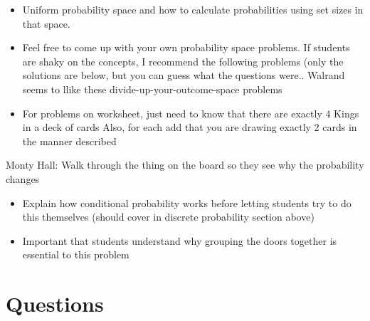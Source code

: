 \documentclass{exam}
\begin{document}
\begin{questions}
\begin{itemize}
\item Uniform probability space and how to calculate probabilities using set sizes in that space.
\item Feel free to come up with your own probability space problems. If students are shaky on the concepts, I recommend the following problems (only the solutions are below, but you can guess what the questions were.. Walrand seems to llike these divide-up-your-outcome-space problems
\item For problems on worksheet, just need to know that there are exactly 4 Kings in a deck of cards
Also, for each add that you are drawing exactly 2 cards in the manner described
\end{itemize}
\item Monty Hall: Walk through the thing on the board so they see why the probability changes
\begin{itemize}
\item Explain how conditional probability works before letting students try to do this themselves (should cover in discrete probability section above)
\item Important that students understand why grouping the doors together is essential to this problem
\end{itemize}
\end{questions}

\section{Questions}
\end{document}
